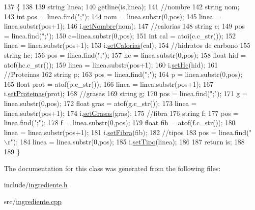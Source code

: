\begin{DoxyCode}
137                                                   \{
138 
139     \textcolor{keywordtype}{string} linea;
140     getline(is,linea);
141     \textcolor{comment}{//nombre}
142     \textcolor{keywordtype}{string} nom;
143     \textcolor{keywordtype}{int} pos = linea.find(\textcolor{stringliteral}{";"});
144     nom = linea.substr(0,pos);
145     linea = linea.substr(pos+1);
146   i.\hyperlink{classingrediente_aac5aba3c36aa762c72a8bc38271e4c12}{setNombre}(nom);
147   \textcolor{comment}{//calorias}
148   \textcolor{keywordtype}{string} c;
149   pos = linea.find(\textcolor{stringliteral}{";"});
150   c=linea.substr(0,pos);
151   \textcolor{keywordtype}{int} cal = atoi(c.c\_str());
152   linea = linea.substr(pos+1);
153   i.\hyperlink{classingrediente_ad58c1fc3e923d2ab95fdacd779c4f4e5}{setCalorias}(cal);
154   \textcolor{comment}{//hidratos de carbono}
155   \textcolor{keywordtype}{string} hc;
156   pos = linea.find(\textcolor{stringliteral}{";"});
157   hc = linea.substr(0,pos);
158   \textcolor{keywordtype}{float} hid = atof(hc.c\_str());
159   linea = linea.substr(pos+1);
160   i.\hyperlink{classingrediente_ad335883ec2bbe4e02cc6422c503944e3}{setHc}(hid);
161   \textcolor{comment}{//Proteinas}
162   \textcolor{keywordtype}{string} p;
163   pos = linea.find(\textcolor{stringliteral}{";"});
164   p = linea.substr(0,pos);
165   \textcolor{keywordtype}{float} prot = atof(p.c\_str());
166   linea = linea.substr(pos+1);
167   i.\hyperlink{classingrediente_a5ee4fac5c35f8ff71e7f974d1675a626}{setProteinas}(prot);
168   \textcolor{comment}{//grasas}
169   \textcolor{keywordtype}{string} g;
170   pos = linea.find(\textcolor{stringliteral}{";"});
171   g = linea.substr(0,pos);
172   \textcolor{keywordtype}{float} gras = atof(g.c\_str());
173   linea = linea.substr(pos+1);
174   i.\hyperlink{classingrediente_a5b20e7a788dcdb5685c66c7362d65533}{setGrasas}(gras);
175   \textcolor{comment}{//fibra}
176   \textcolor{keywordtype}{string} f;
177   pos = linea.find(\textcolor{stringliteral}{";"});
178   f = linea.substr(0,pos);
179   \textcolor{keywordtype}{float} fib = atof(f.c\_str());
180   linea = linea.substr(pos+1);
181   i.\hyperlink{classingrediente_a13928358db435d4a42b348f6ea1ee548}{setFibra}(fib);
182   \textcolor{comment}{//tipos}
183   pos = linea.find(\textcolor{stringliteral}{"\(\backslash\)r"});
184   linea = linea.substr(0,pos);
185   i.\hyperlink{classingrediente_ae51c71ad615844974ee24bb2fe9c7b80}{setTipo}(linea);
186 
187   \textcolor{keywordflow}{return} is;
188 
189 \}
\end{DoxyCode}


The documentation for this class was generated from the following files\+:\begin{DoxyCompactItemize}
\item 
include/\hyperlink{ingrediente_8h}{ingrediente.\+h}\item 
src/\hyperlink{ingrediente_8cpp}{ingrediente.\+cpp}\end{DoxyCompactItemize}
